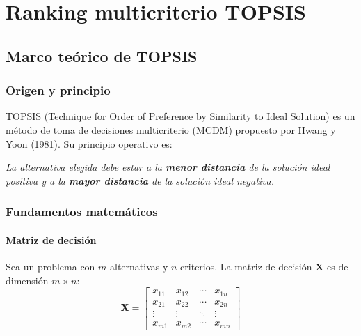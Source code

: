 \documentclass[12pt,a4paper,oneside]{book}
\begin{document}
\chapter{Ranking multicriterio TOPSIS}
\label{chap:topsis}




\section{Marco teórico de TOPSIS}

\subsection{Origen y principio}

TOPSIS (Technique for Order of Preference by Similarity to Ideal Solution) es un método de toma de decisiones multicriterio (MCDM) propuesto por Hwang y Yoon (1981). Su principio operativo es:

\begin{tcolorbox}[colback=lightgray, colframe=primary, boxrule=0.5pt]
\textit{La alternativa elegida debe estar a la \textbf{menor distancia} de la \emph{solución ideal positiva} y a la \textbf{mayor distancia} de la \emph{solución ideal negativa}.}
\end{tcolorbox}

\subsection{Fundamentos matemáticos}

\subsubsection{Matriz de decisión}

Sea un problema con $m$ alternativas y $n$ criterios. La matriz de decisión $\mathbf{X}$ es de dimensión $m \times n$:
\begin{equation}
\mathbf{X} = \begin{bmatrix}
x_{11} & x_{12} & \cdots & x_{1n} \\
x_{21} & x_{22} & \cdots & x_{2n} \\
\vdots & \vdots & \ddots & \vdots \\
x_{m1} & x_{m2} & \cdots & x_{mn}
\end{bmatrix}
\end{equation}
\end{document}
